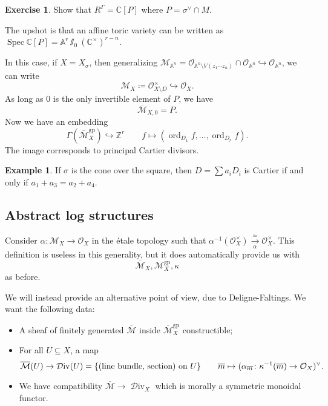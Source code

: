 \documentclass[leqno, openany]{memoir}
\theoremstyle{definition}
\newtheorem{exm}[thm]{Example}
\newtheorem{exer}[thm]{Exercise}
\theoremstyle{remark}
\theoremstyle{plain}
\theoremstyle{definition}
\theoremstyle{remark}
\newcommand{\A}{\mathbb{A}}
\newcommand{\C}{\mathbb{C}}
\newcommand{\Z}{\mathbb{Z}}
\newcommand{\mc}[1]{\mathcal{#1}}
\newcommand{\mr}[1]{\mathrm{#1}}
\newcommand{\on}[1]{\operatorname{#1}}
\newcommand{\ol}[1]{\overline{#1}}
\DeclareMathOperator{\Spec}{Spec}
\begin{document}
\begin{exer}
    Show that $R^{\Gamma} = \C[P]$ where $P = \sigma^{\vee} \cap M$.
\end{exer}

The upshot is that an affine toric variety can be written as $\Spec \C[P] = \A^r \sslash_0 (\C^{\times})^{r-n}$.

In this case, if $X = X_{\sigma}$, then generalizing $\mc{M}_{\A^n} = \mc{O}_{\A^n \setminus V(z_1\cdots z_n)} \cap \mc{O}_{\A^n} \hookrightarrow \mc{O}_{\A^n}$, we can write
\[ \mc{M}_X \coloneqq \mc{O}_{X\setminus D}^{\times} \hookrightarrow \mc{O}_X. \]
As long as $0$ is the only invertible element of $P$, we have
\[ \ol{\mc{M}}_{X,0} = P. \]
Now we have an embedding
\[ \Gamma(\ol{\mc{M}}_{X}^{\mr{gp}}) \hookrightarrow \Z^r \qquad f \mapsto (\on{ord}_{D_1} f, \ldots, \on{ord}_{D_r} f). \]
The image corresponds to principal Cartier divisors.

\begin{exm}
    If $\sigma$ is the cone over the square, then $D = \sum a_i D_i$ is Cartier if and only if $a_1+a_3 = a_2 + a_4$.
\end{exm}

\subsection{Abstract log structures}
Consider $\alpha \colon \mc{M}_X \to \mc{O}_X$ in the \'etale topology such that $\alpha^{-1}(\mc{O}_X^{\times}) \xrightarrow[\alpha]{\simeq} \mc{O}_X^{\times}$. This definition is useless in this generality, but it does automatically provide us with
\[ \ol{\mc{M}}_X, \mc{M}_X^{\mr{gp}}, \kappa \]
as before.

We will instead provide an alternative point of view, due to Deligne-Faltings. We want the following data:
\begin{itemize}
    \item A sheaf of finitely generated $\ol{\mc{M}}$ inside $\ol{\mc{M}}_X^{\mr{gp}}$ constructible;
    \item For all $U \subseteq X$, a map 
        \[ \ol{\mc{M}}(U) \to \on{\mc{D}iv}(U) = \qty{(\text{line bundle, section}) \text{ on }U} \qquad \ol{m} \mapsto (\alpha_{\ol{m}} \colon \kappa^{-1}(\ol{m}) \to \mc{O}_X)^{\vee}. \]
    \item We have compatibility $\ol{\mc{M}} \to \on{\mc{D}iv}_X$ which is morally a symmetric monoidal functor.%
\end{itemize}
\end{document}
